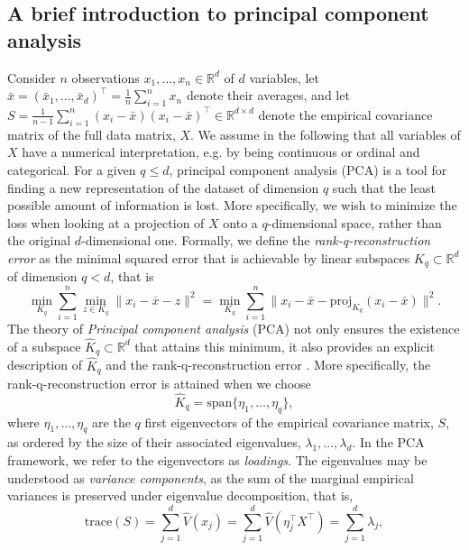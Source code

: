 \documentclass[titlepage,11pt,twoside]{article}
\newcommand{\RR}{\mathbb{R}}
\begin{document}
\subsection{A brief introduction to principal component analysis}
Consider $n$ observations $x_1,\dotsc,x_n \in \RR^d$ of $d$ variables, let $\bar{x} = (\bar{x}_1, ..., \bar{x}_d)^\top = \frac{1}{n} \sum_{i=1}^n x_n$ denote their averages, and let $S = \frac{1}{n-1} \sum_{i=1}^n (x_i-\bar{x}) (x_i-\bar{x})^\top \in \RR^{d \times d}$ denote the empirical covariance matrix of the full data matrix, $X$. We assume in the following that all variables of $X$ have a numerical interpretation, e.g. by being continuous or ordinal and categorical. For a given $q \leq d$, principal component analysis (PCA) is a tool for finding a new representation of the dataset of dimension $q$ such that the least possible amount of information is lost. More specifically, we wish to minimize the loss when looking at a projection of $X$ onto a $q$-dimensional space, rather than the original $d$-dimensional one. Formally, we define the \emph{rank-q-reconstruction error} as the minimal squared error that is achievable by linear subspaces $K_q \subset \RR^d$ of dimension $q < d$, that is
\begin{equation*}
\min_{K_q} \sum_{i=1}^n \min_{z \in K_q} \lVert x_i - \bar{x} - z \rVert^2 =
\min_{K_q} \sum_{i=1}^n \lVert x_i - \bar{x} - \text{proj}_{K_q}(x_i - \bar{x}) \rVert^2.
\end{equation*}
The theory of \emph{Principal component analysis} (PCA) not only ensures the existence of a subspace $\hat{K}_q \subset \RR^d$ that attains this minimum, it also provides an explicit description of $\hat{K}_q$ and the rank-q-reconstruction error \citep{HastieEtAl2009}. More specifically, the rank-q-reconstruction error is attained when we choose
\begin{equation*}
\hat{K}_q = \text{span}\{\eta_1,\dotsc,\eta_q\},
\end{equation*}
where $\eta_1, ..., \eta_q$ are the $q$ first eigenvectors of the empirical covariance matrix, $S$, as ordered by the size of their associated eigenvalues, $\lambda_1, \dotsc, \lambda_d$. In the PCA framework, we refer to the eigenvectors as \textit{loadings}. The eigenvalues may be understood as \textit{variance components}, as the sum of the marginal empirical variances is preserved under eigenvalue decomposition, that is,
\begin{equation*}
\text{trace}(S) = \sum_{j=1}^d \hat{V}(x_j) = \sum_{j=1}^d \hat{V}(\eta_j^\top X^\top) = \sum_{j=1}^d \lambda_j,
\end{equation*}
\end{document}
